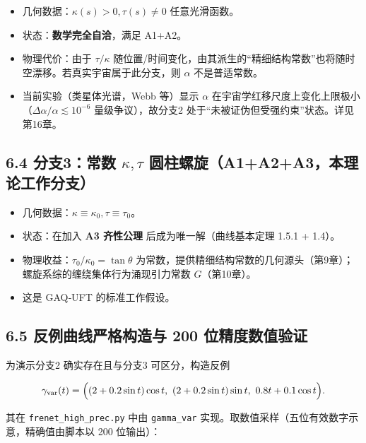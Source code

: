 \begin{itemize}
\tightlist
\item
  几何数据：\(\kappa(s)>0,\tau(s)\neq0\) 任意光滑函数。
\item
  状态：\textbf{数学完全自洽}，满足 A1+A2。
\item
  物理代价：由于 \(\tau/\kappa\)
  随位置/时间变化，由其派生的``精细结构常数''也将随时空漂移。若真实宇宙属于此分支，则
  \(\alpha\) 不是普适常数。
\item
  当前实验（类星体光谱，Webb 等）显示 \(\alpha\)
  在宇宙学红移尺度上变化上限极小（\(\Delta\alpha/\alpha\lesssim 10^{-6}\)
  量级争议），故分支2 处于``未被证伪但受强约束''状态。详见第16章。
\end{itemize}

\subsection{\texorpdfstring{6.4 分支3：常数 \(\kappa,\tau\)
圆柱螺旋（A1+A2+A3，本理论工作分支）}{6.4 分支3：常数 \textbackslash kappa,\textbackslash tau 圆柱螺旋（A1+A2+A3，本理论工作分支）}}\label{ux5206ux652f3ux5e38ux6570-kappatau-ux5706ux67f1ux87baux65cba1a2a3ux672cux7406ux8bbaux5de5ux4f5cux5206ux652f}

\begin{itemize}
\tightlist
\item
  几何数据：\(\kappa\equiv\kappa_0,\tau\equiv\tau_0\)。
\item
  状态：在加入 \textbf{A3 齐性公理} 后成为唯一解（曲线基本定理 1.5.1 +
  1.4）。
\item
  物理收益：\(\tau_0/\kappa_0=\tan\theta\)
  为常数，提供精细结构常数的几何源头（第9章）；螺旋系综的缠绕集体行为涌现引力常数
  \(G\)（第10章）。
\item
  这是 GAQ‑UFT 的标准工作假设。
\end{itemize}

\subsection{6.5 反例曲线严格构造与 200
位精度数值验证}\label{ux53cdux4f8bux66f2ux7ebfux4e25ux683cux6784ux9020ux4e0e-200-ux4f4dux7cbeux5ea6ux6570ux503cux9a8cux8bc1}

为演示分支2 确实存在且与分支3 可区分，构造反例

\[
\gamma_{\mathrm{var}}(t)=\Bigl((2+0.2\sin t)\cos t,\ (2+0.2\sin t)\sin t,\ 0.8t+0.1\cos t\Bigr).
\]

其在 \texttt{frenet\_high\_prec.py} 中由 \texttt{gamma\_var}
实现。取数值采样（五位有效数字示意，精确值由脚本以 200 位输出）：


